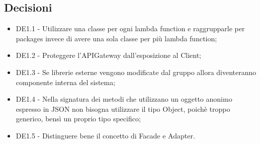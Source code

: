 \documentclass[a4paper,titlepage]{article}
\begin{document}
 \subsection{Decisioni}
 \begin{itemize}
  \item DE1.1 - Utilizzare una classe per ogni lambda function e raggrupparle per packages invece di avere una sola classe per più lambda function;
  \item DE1.2 - Proteggere l'APIGateway dall'esposizione al Client;
  \item DE1.3 - Se librerie esterne vengono modificate dal gruppo \GRUPPO{} allora diventeranno componente interna del sistema;
  \item DE1.4 - Nella signatura dei metodi che utilizzano un oggetto anonimo espresso in JSON non bisogna utilizzare il tipo Object, poichè troppo generico, bensì un proprio tipo specifico;
  \item DE1.5 - Distinguere bene il concetto di Facade e Adapter.
 \end{itemize}
\end{document}
